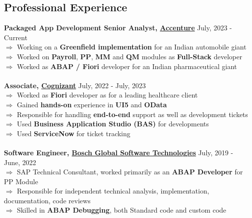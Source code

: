 \documentclass[margin, centered, a4paper]{res}
\begin{document}
\begin{resume}

\section{Professional Experience}
\textbf{Packaged App Development Senior Analyst, \href{https://www.linkedin.com/company/accentureindia/}{Accenture}} \hfill{July, 2023 - Current}\\
$\Rightarrow$ Working on a \textbf{Greenfield implementation} for an Indian automobile giant\\
$\Rightarrow$ Worked on \textbf{Payroll}, \textbf{PP}, \textbf{MM} and \textbf{QM} modules as \textbf{Full-Stack} developer\\
$\Rightarrow$ Worked as \textbf{ABAP / Fiori} developer for an Indian pharmaceutical giant\\
\\
\textbf{Associate, \href{https://www.linkedin.com/company/cognizant}{Cognizant}} \hfill{July, 2022 - July, 2023}\\
$\Rightarrow$ Worked as \textbf{Fiori} developer as for a leading healthcare client\\
$\Rightarrow$ Gained \textbf{hands-on} experience in \textbf{UI5} and \textbf{OData}\\
$\Rightarrow$ Responsible for handling \textbf{end-to-end} support as well as development tickets\\
$\Rightarrow$ Used \textbf{Business Application Studio (BAS)} for developments\\
$\Rightarrow$ Used \textbf{ServiceNow} for ticket tracking\\
\\
\textbf{Software Engineer, \href{https://www.linkedin.com/company/bosch-global-software-technologies/}{Bosch Global Software Technologies}} \hfill{July, 2019 - June, 2022}\\
$\Rightarrow$ SAP Technical Consultant, worked primarily as an \textbf{ABAP Developer} for PP Module\\
$\Rightarrow$ Responsible for independent technical analysis, implementation, documentation, code reviews\\
$\Rightarrow$ Skilled in \textbf{ABAP Debugging}, both Standard code and custom code\\

\end{resume}
\end{document}
